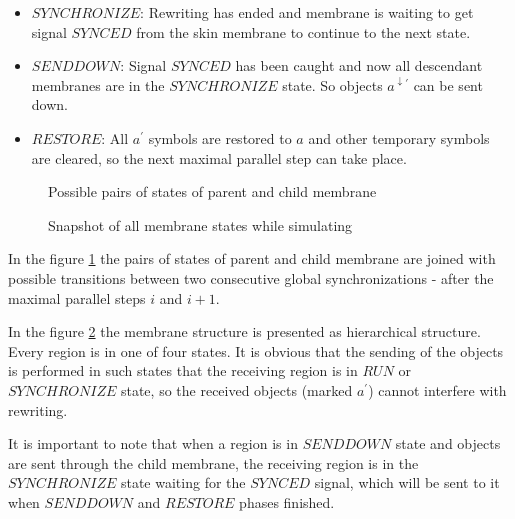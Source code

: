 \begin{dokaz}
\begin{itemize}
    \item $SYNCHRONIZE$: Rewriting has ended and membrane is waiting to get signal $SYNCED$ from the skin membrane to continue to the next state.

    \item $SENDDOWN$: Signal $SYNCED$ has been caught and now all descendant membranes are in the $SYNCHRONIZE$ state. So objects $a^{\downarrow\prime}$ can be sent down.

    \item $RESTORE$: All $a^{\prime}$ symbols are restored to $a$ and other temporary symbols are cleared, so the next maximal parallel step can take place.
  \end{itemize}

  \begin{figure}
    \def\svgwidth{\textwidth}
    
    \caption{Possible pairs of states of parent and child membrane}
    \label{fig:possible_pairs_of_states_of_parent_and_child_membrane}
  \end{figure}

  \begin{figure}
    \def\svgwidth{\textwidth}
    
    \caption{Snapshot of all membrane states while simulating}
    \label{fig:snapshot_of_all_membrane_states_while_simulating}
  \end{figure}

  In the figure \ref{fig:possible_pairs_of_states_of_parent_and_child_membrane} the pairs of states of parent and child membrane are joined with possible transitions between two consecutive global synchronizations - after the maximal parallel steps $i$ and $i+1$.

  In the figure \ref{fig:snapshot_of_all_membrane_states_while_simulating} the membrane structure is presented as hierarchical structure. Every region is in one of four states. It is obvious that the sending of the objects is performed in such states that the receiving region is in $RUN$ or $SYNCHRONIZE$ state, so the received objects (marked $a^{\prime}$) cannot interfere with rewriting.

  It is important to note that when a region is in $SENDDOWN$ state and objects are sent through the child membrane, the receiving region is in the $SYNCHRONIZE$ state waiting for the $SYNCED$ signal, which will be sent to it when $SENDDOWN$ and $RESTORE$ phases finished.
  


\end{dokaz}
